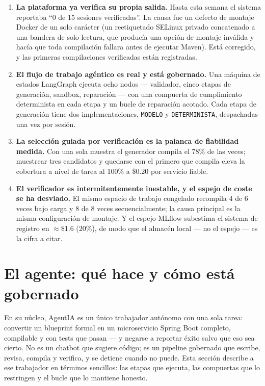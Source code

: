\documentclass[11pt,a4paper]{article}
\begin{document}
\begin{enumerate}[leftmargin=1.4em]
  \item \textbf{La plataforma ya verifica su propia salida.} Hasta esta semana el
  sistema reportaba ``0 de 15 sesiones verificadas''. La causa fue un defecto de
  montaje Docker de un solo carácter (un reetiquetado SELinux privado concatenado a
  una bandera de solo-lectura, que producía una opción de montaje inválida y hacía
  que toda compilación fallara antes de ejecutar Maven). Está corregido, y las
  primeras compilaciones verificadas están registradas.
  \item \textbf{El flujo de trabajo agéntico es real y está gobernado.} Una máquina de
  estados LangGraph ejecuta ocho nodos --- validador, cinco etapas de generación,
  sandbox, reparación --- con una compuerta de cumplimiento determinista en cada etapa
  y un bucle de reparación acotado. Cada etapa de generación tiene dos
  implementaciones, \texttt{MODELO} y \texttt{DETERMINISTA}, despachadas una vez por
  sesión.
  \item \textbf{La selección guiada por verificación es la palanca de fiabilidad
  medida.} Con una sola muestra el generador compila el 78\% de las veces; muestrear
  tres candidatos y quedarse con el primero que compila eleva la cobertura a nivel de
  tarea al 100\% a \$0.20 por servicio fiable.
  \item \textbf{El verificador es intermitentemente inestable, y el espejo de coste se
  ha desviado.} El mismo espacio de trabajo congelado recompila 4 de 6 veces bajo
  carga y 8 de 8 veces secuencialmente; la causa principal es la misma configuración
  de montaje. Y el espejo MLflow subestima el sistema de registro en $\approx$\$1.6
  (20\%), de modo que el almacén local --- no el espejo --- es la cifra a citar.
\end{enumerate}

\section{El agente: qué hace y cómo está gobernado}

En su núcleo, AgentIA es un único trabajador autónomo con una sola tarea: convertir
un blueprint formal en un microservicio Spring Boot completo, compilable y con tests
que pasan --- y negarse a reportar éxito salvo que eso sea cierto. No es un chatbot
que sugiere código; es un pipeline gobernado que escribe, revisa, compila y verifica,
y se detiene cuando no puede. Esta sección describe a ese trabajador en términos
sencillos: las etapas que ejecuta, las compuertas que lo restringen y el bucle que lo
mantiene honesto.
\end{document}
